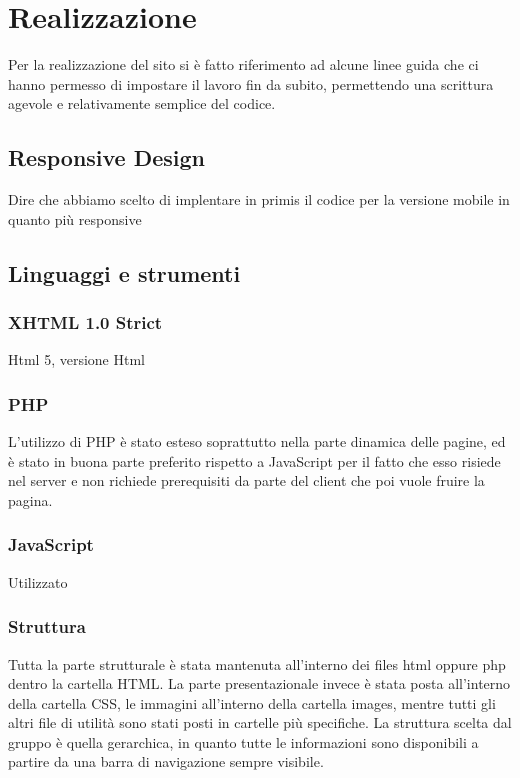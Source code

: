 \newpage
\section{Realizzazione}
Per la realizzazione del sito si è fatto riferimento ad alcune linee guida che ci hanno permesso di impostare il lavoro fin da subito, permettendo una scrittura agevole e relativamente semplice del codice.

\subsection{Responsive Design}
Dire che abbiamo scelto di implentare in primis il codice per la versione mobile in quanto più responsive

\subsection{Linguaggi e strumenti}

\subsubsection{XHTML 1.0 Strict}
Html 5, versione Html 

\subsubsection{PHP}
L'utilizzo di PHP è stato esteso soprattutto nella parte dinamica delle pagine, ed è stato in buona parte preferito rispetto a JavaScript per il fatto che esso risiede nel server e non richiede prerequisiti da parte del client che poi vuole fruire la pagina.

\subsubsection{JavaScript}
Utilizzato 

\subsubsection{Struttura}
Tutta la parte strutturale è stata mantenuta all'interno dei files html oppure php dentro la cartella HTML. La parte presentazionale invece è stata posta all'interno della cartella CSS, le immagini all'interno della cartella images, mentre tutti gli altri file di utilità sono stati posti in cartelle più specifiche. La struttura scelta dal gruppo è quella gerarchica, in quanto tutte le informazioni sono disponibili a partire da una barra di navigazione sempre visibile.

